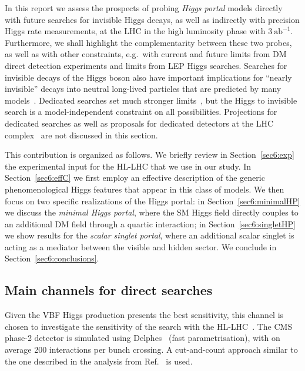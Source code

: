 \documentclass[../report.tex]{subfiles}
\begin{document}
In this report we assess the prospects of probing \emph{Higgs portal} models directly with future searches for invisible Higgs decays, as well as indirectly with precision Higgs rate measurements, at the LHC in the high luminosity phase with $3~\mathrm{ab}^{-1}$. Furthermore, we shall highlight the complementarity between these two probes, as well as with other constraints, e.g.~with current and future limits from DM direct detection experiments and limits from LEP Higgs searches. Searches for invisible decays of the Higgs boson also have important implications for ``nearly invisible'' decays into neutral long-lived particles that are predicted by many models~\cite{Curtin:2018mvb}. Dedicated searches set much stronger limits~\cite{Aad:2015uaa,ATLAS:2016jza,Aaij:2016xmb,CMS:2014hka}, but the Higgs to invisible search is a model-independent constraint on all possibilities.  Projections for dedicated searches as well as proposals for dedicated detectors at the LHC complex~\cite{Chou:2016lxi,Gligorov:2017nwh} are not discussed in this section.

This contribution is organized as follows. We briefly review in Section~\ref{sec6:exp} the experimental input for the HL-LHC that we use in our study. In Section~\ref{sec6:effC} we first employ an effective description of the generic phenomenological Higgs features that appear in this class of models. We then focus on two specific realizations of the Higgs portal: in Section~\ref{sec6:minimalHP} we discuss the \emph{minimal Higgs portal}, where the SM Higgs field directly couples to an additional DM field through a quartic interaction; in Section~\ref{sec6:singletHP} we show results for the \emph{scalar singlet portal}, where an additional scalar singlet is acting as a mediator between the visible and hidden sector. We conclude in Section~\ref{sec6:conclusions}.


\subsection{Main channels for direct searches}\label{sec:expinp}

Given the VBF Higgs production presents the best sensitivity, this channel is chosen to investigate the sensitivity of the search with the HL-LHC~\cite{CMS-PAS-FTR-18-016}. The CMS phase-2 detector is simulated using Delphes~\cite{deFavereau:2013fsa} (fast parametrisation), with on average 200 interactions per bunch crossing.  A
cut-and-count approach similar to the one described in the analysis from Ref.~\cite{Sirunyan:2018owy} is used.
\end{document}
